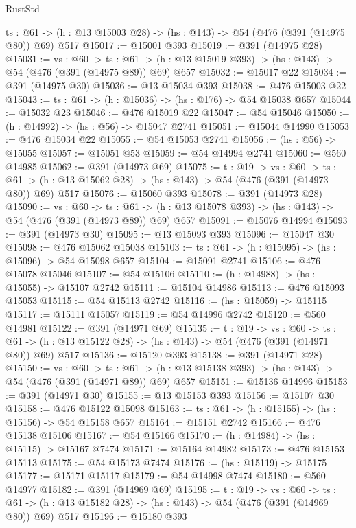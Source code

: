 \begin{lexlean}{RustStd}
\begin{coremodule}
  {ts : @61} -> (h : @13 @15003 @28) -> (hs : @143) -> @54 (@476 (@391 (@14975 @80)) @69) @517
@15017 := @15001 @393
@15019 := @391 (@14975 @28)
@15031 := {vs : @60} ->
  {ts : @61} -> (h : @13 @15019 @393) -> (hs : @143) -> @54 (@476 (@391 (@14975 @89)) @69) @657
@15032 := @15017 @22
@15034 := @391 (@14975 @30)
@15036 := @13 @15034 @393
@15038 := @476 @15003 @22
@15043 := {ts : @61} -> (h : @15036) -> (hs : @176) -> @54 @15038 @657
@15044 := @15032 @23
@15046 := @476 @15019 @22
@15047 := @54 @15046
@15050 := (h : @14992) -> (hs : @56) -> @15047 @2741
@15051 := @15044 @14990
@15053 := @476 @15034 @22
@15055 := @54 @15053 @2741
@15056 := (hs : @56) -> @15055
@15057 := @15051 @53
@15059 := @54 @14994 @2741
@15060 := @560 @14985
@15062 := @391 (@14973 @69)
@15075 := {t : @19} ->
  {vs : @60} ->
  {ts : @61} -> (h : @13 @15062 @28) -> (hs : @143) -> @54 (@476 (@391 (@14973 @80)) @69) @517
@15076 := @15060 @393
@15078 := @391 (@14973 @28)
@15090 := {vs : @60} ->
  {ts : @61} -> (h : @13 @15078 @393) -> (hs : @143) -> @54 (@476 (@391 (@14973 @89)) @69) @657
@15091 := @15076 @14994
@15093 := @391 (@14973 @30)
@15095 := @13 @15093 @393
@15096 := @15047 @30
@15098 := @476 @15062 @15038
@15103 := {ts : @61} -> (h : @15095) -> (hs : @15096) -> @54 @15098 @657
@15104 := @15091 @2741
@15106 := @476 @15078 @15046
@15107 := @54 @15106
@15110 := (h : @14988) -> (hs : @15055) -> @15107 @2742
@15111 := @15104 @14986
@15113 := @476 @15093 @15053
@15115 := @54 @15113 @2742
@15116 := (hs : @15059) -> @15115
@15117 := @15111 @15057
@15119 := @54 @14996 @2742
@15120 := @560 @14981
@15122 := @391 (@14971 @69)
@15135 := {t : @19} ->
  {vs : @60} ->
  {ts : @61} -> (h : @13 @15122 @28) -> (hs : @143) -> @54 (@476 (@391 (@14971 @80)) @69) @517
@15136 := @15120 @393
@15138 := @391 (@14971 @28)
@15150 := {vs : @60} ->
  {ts : @61} -> (h : @13 @15138 @393) -> (hs : @143) -> @54 (@476 (@391 (@14971 @89)) @69) @657
@15151 := @15136 @14996
@15153 := @391 (@14971 @30)
@15155 := @13 @15153 @393
@15156 := @15107 @30
@15158 := @476 @15122 @15098
@15163 := {ts : @61} -> (h : @15155) -> (hs : @15156) -> @54 @15158 @657
@15164 := @15151 @2742
@15166 := @476 @15138 @15106
@15167 := @54 @15166
@15170 := (h : @14984) -> (hs : @15115) -> @15167 @7474
@15171 := @15164 @14982
@15173 := @476 @15153 @15113
@15175 := @54 @15173 @7474
@15176 := (hs : @15119) -> @15175
@15177 := @15171 @15117
@15179 := @54 @14998 @7474
@15180 := @560 @14977
@15182 := @391 (@14969 @69)
@15195 := {t : @19} ->
  {vs : @60} ->
  {ts : @61} -> (h : @13 @15182 @28) -> (hs : @143) -> @54 (@476 (@391 (@14969 @80)) @69) @517
@15196 := @15180 @393

\end{coremodule}
\end{lexlean}
